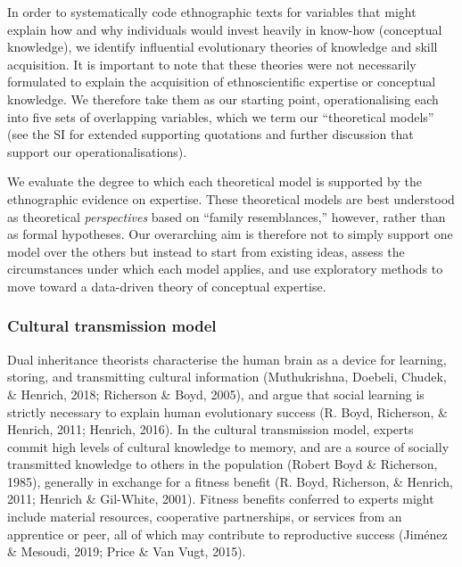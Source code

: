 \documentclass[
  11pt,
]{article}
\begin{document}
In order to systematically code ethnographic texts for variables that might explain how and why individuals would invest heavily in know-how (conceptual knowledge), we identify influential evolutionary theories of knowledge and skill acquisition. It is important to note that these theories were not necessarily formulated to explain the acquisition of ethnoscientific expertise or conceptual knowledge. We therefore take them as our starting point, operationalising each into five sets of overlapping variables, which we term our ``theoretical models'' (see the SI for extended supporting quotations and further discussion that support our operationalisations).

We evaluate the degree to which each theoretical model is supported by the ethnographic evidence on expertise. These theoretical models are best understood as theoretical \emph{perspectives} based on ``family resemblances,'' however, rather than as formal hypotheses. Our overarching aim is therefore not to simply support one model over the others but instead to start from existing ideas, assess the circumstances under which each model applies, and use exploratory methods to move toward a data-driven theory of conceptual expertise.

\hypertarget{cultural-transmission-model}{%
\subsubsection{Cultural transmission model}\label{cultural-transmission-model}}

Dual inheritance theorists characterise the human brain as a device for learning, storing, and transmitting cultural information (Muthukrishna, Doebeli, Chudek, \& Henrich, 2018; Richerson \& Boyd, 2005), and argue that social learning is strictly necessary to explain human evolutionary success (R. Boyd, Richerson, \& Henrich, 2011; Henrich, 2016). In the cultural transmission model, experts commit high levels of cultural knowledge to memory, and are a source of socially transmitted knowledge to others in the population (Robert Boyd \& Richerson, 1985), generally in exchange for a fitness benefit (R. Boyd, Richerson, \& Henrich, 2011; Henrich \& Gil-White, 2001). Fitness benefits conferred to experts might include material resources, cooperative partnerships, or services from an apprentice or peer, all of which may contribute to reproductive success (Jiménez \& Mesoudi, 2019; Price \& Van Vugt, 2015).
\end{document}
